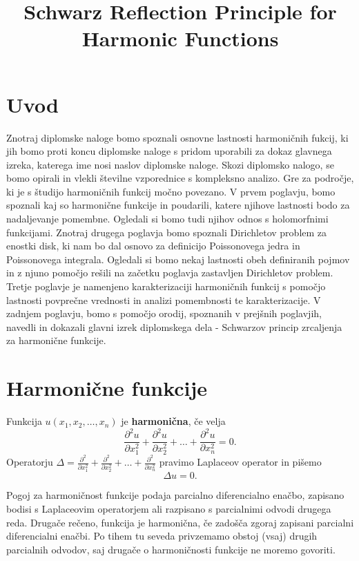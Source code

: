 \documentclass[mat1]{fmfdelo}
\title{Schwarz Reflection Principle for Harmonic Functions}
\begin{document}
\section{Uvod}
Znotraj diplomske naloge bomo spoznali osnovne lastnosti harmoničnih fukcij, ki jih bomo proti koncu diplomske naloge s pridom uporabili za dokaz glavnega izreka, katerega ime nosi naslov diplomske naloge.
Skozi diplomsko nalogo, se bomo opirali in vlekli številne vzporednice s kompleksno analizo. Gre za področje, ki je s študijo harmoničnih funkcij močno povezano.
\newline
V prvem poglavju, bomo spoznali kaj so harmonične funkcije in poudarili, katere njihove lastnosti bodo za nadaljevanje pomembne. Ogledali si bomo tudi njihov odnos s holomorfnimi funkcijami. 
Znotraj drugega poglavja bomo spoznali Dirichletov problem za enostki disk, ki nam bo dal osnovo za definicijo Poissonovega jedra in Poissonovega integrala. Ogledali si bomo nekaj lastnosti obeh definiranih pojmov in z njuno pomočjo rešili na začetku poglavja zastavljen Dirichletov problem.
Tretje poglavje je namenjeno karakterizaciji harmoničnih funkcij s pomočjo lastnosti povprečne vrednosti in analizi pomembnosti te karakterizacije. 
V zadnjem poglavju, bomo s pomočjo orodij, spoznanih v prejšnih poglavjih, navedli in dokazali glavni izrek diplomskega dela - Schwarzov princip zrcaljenja za harmonične funkcije.
%

\section{Harmonične funkcije}
    \begin{definicija}
        Funkcija $u(x_1, x_2, \dots, x_n)$ je \textbf{harmonična}, če velja
        $$
        \frac{\partial^2 u}{\partial x_1 ^ 2} +  \frac{\partial^2 u}{\partial x_2 ^ 2} + \dots + \frac{\partial^2 u}{\partial x_n ^ 2} = 0.
        $$
        Operatorju $\Delta  = \frac{\partial^2}{\partial x_1 ^ 2} +  \frac{\partial^2}{\partial x_2 ^ 2} + \dots + \frac{\partial^2}{\partial x_n ^ 2}$ pravimo Laplaceov operator in pišemo
        $$
        \Delta u = 0.
        $$
    \end{definicija}

    Pogoj za harmoničnost funkcije podaja parcialno diferencialno enačbo, zapisano bodisi s Laplaceovim operatorjem ali razpisano s parcialnimi odvodi drugega reda. Drugače rečeno, funkcija je harmonična, če zadošča zgoraj zapisani parcialni diferencialni enačbi. 
    Po tihem tu seveda privzemamo obstoj (vsaj) drugih parcialnih odvodov, saj drugače o harmoničnosti funkcije ne moremo govoriti.
\end{document}
